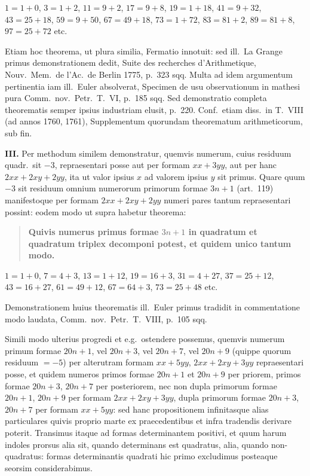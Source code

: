 \documentclass[12pt,a4paper]{article}
\theoremstyle{plain}
\begin{document}
$1 = 1 + 0$, $3 = 1 + 2$, $11 = 9 + 2$, $17 = 9 + 8$, $19 = 1 + 18$, $41 = 9 + 32$, $43 = 25 + 18$, $59 = 9 + 50$, $67 = 49 + 18$, $73 = 1 + 72$, $83 = 81 + 2$, $89 = 81 + 8$, $97 = 25 + 72$ etc.

Etiam hoc theorema, ut plura similia, Fermatio innotuit: sed ill.~La Grange primus demonstrationem dedit, Suite des recherches d'Arithmetique, Nouv.~Mem.~de l'Ac.~de Berlin 1775, p.~323 sqq. Multa ad idem argumentum pertinentia iam ill.~Euler absolverat, Specimen de usu observationum in mathesi pura Comm.~nov.~Petr.~T.~VI, p.~185 sqq. Sed demonstratio completa theorematis semper ipsius industriam elusit, p.~220. Conf.~etiam diss.~in T.~VIII (ad annos 1760, 1761), Supplementum quorundam theorematum arithmeticorum, sub fin.

\textbf{III.} Per methodum similem demonstratur, quemvis numerum, cuius residuum quadr.~sit $-3$, repraesentari posse aut per formam $xx + 3yy$, aut per hanc $2xx + 2xy + 2yy$, ita ut valor ipsius $x$ ad valorem ipsius $y$ sit primus. Quare quum $-3$ sit residuum omnium numerorum primorum formae $3n+1$ (art.~119) manifestoque per formam $2xx + 2xy + 2yy$ numeri pares tantum repraesentari possint: eodem modo ut supra habetur theorema:

\begin{quote}
\textbf{Quivis numerus primus formae $3n+1$ in quadratum et quadratum triplex decomponi potest, et quidem unico tantum modo.}
\end{quote}

$1 = 1 + 0$, $7 = 4 + 3$, $13 = 1 + 12$, $19 = 16 + 3$, $31 = 4 + 27$, $37 = 25 + 12$, $43 = 16 + 27$, $61 = 49 + 12$, $67 = 64 + 3$, $73 = 25 + 48$ etc.

Demonstrationem huius theorematis ill.~Euler primus tradidit in commentatione modo laudata, Comm.~nov.~Petr.~T.~VIII, p.~105 sqq.

Simili modo ulterius progredi et e.g.~ostendere possemus, quemvis numerum primum formae $20n+1$, vel $20n+3$, vel $20n+7$, vel $20n+9$ (quippe quorum residuum $= -5$) per alterutram formam $xx + 5yy$, $2xx + 2xy + 3yy$ repraesentari posse, et quidem numeros primos formae $20n+1$ et $20n+9$ per priorem, primos formae $20n+3$, $20n+7$ per posteriorem, nec non dupla primorum formae $20n+1$, $20n+9$ per formam $2xx + 2xy + 3yy$, dupla primorum formae $20n+3$, $20n+7$ per formam $xx + 5yy$: sed hanc propositionem infinitasque alias particulares quivis proprio marte ex praecedentibus et infra tradendis derivare poterit. Transimus itaque ad formas determinantem positivi, et quum harum indoles prorsus alia sit, quando determinans est quadratus, alia, quando non-quadratus: formas determinantis quadrati hic primo excludimus posteaque seorsim considerabimus.
\end{document}
